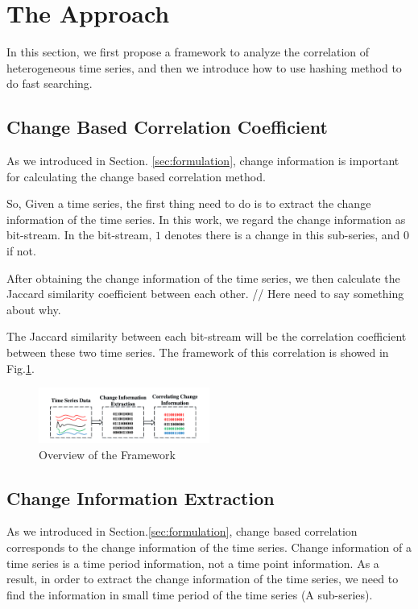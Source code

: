 \section{The Approach}
\label{sec:framework}
In this section, we first propose a framework to analyze the correlation of heterogeneous time series, and then we introduce how to use hashing method to do fast searching.

\subsection{Change Based Correlation Coefficient}

As we introduced in Section. \ref{sec:formulation}, change information is important for calculating the change based correlation method. 

So, Given a time series, the first thing need to do is to extract the change information of the time series. In this work, we regard the change information as bit-stream. In the bit-stream, $1$ denotes there is a change in this sub-series, and $0$ if not.

After obtaining the change information of the time series, we then calculate the Jaccard similarity\cite{han2011data} coefficient between each other.
// Here need to say something about why.

The Jaccard similarity between each bit-stream will be the correlation coefficient between these two time series. 
The framework of this correlation is showed in Fig.\ref{fig:frame}.

\begin{figure}[t]
\centering
\includegraphics[width=0.5\textwidth]{framework.pdf}
\caption{Overview of the Framework}
\label{fig:frame}
\end{figure}

\subsection{Change Information Extraction}
\label{ChangeCorrelation}

As we introduced in Section.\ref{sec:formulation}, change based correlation corresponds to the change information of the time series. Change information of a time series is a time period information, not a time point information. As a result, in order to extract the change information of the time series, we need to find the information in small time period of the time series (A sub-series). 

